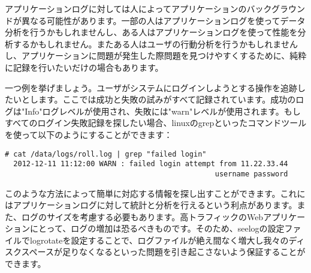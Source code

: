 アプリケーションログに対しては人によってアプリケーションのバックグラウンドが異なる可能性があります。一部の人はアプリケーションログを使ってデータ分析を行うかもしれませんし、ある人はアプリケーションログを使って性能を分析するかもしれません。またある人はユーザの行動分析を行うかもしれませんし、アプリケーションに問題が発生した際問題を見つけやすくするために、純粋に記録を行いたいだけの場合もあります。

一つ例を挙げましょう。ユーザがシステムにログインしようとする操作を追跡したいとします。ここでは成功と失敗の試みがすべて記録されています。成功のログは"Info"ログレベルが使用され、失敗には"warn"レベルが使用されます。もしすべてのログイン失敗記録を探したい場合、linuxのgrepといったコマンドツールを使って以下のようにすることができます：

\begin{lstlisting}[numbers=none]
# cat /data/logs/roll.log | grep "failed login"
  2012-12-11 11:12:00 WARN : failed login attempt from 11.22.33.44
                                                 username password
\end{lstlisting}


このような方法によって簡単に対応する情報を探し出すことができます。これにはアプリケーションログに対して統計と分析を行えるという利点があります。また、ログのサイズを考慮する必要もあります。高トラフィックのWebアプリケーションにとって、ログの増加は恐るべきものです。そのため、seelogの設定ファイルでlogrotateを設定することで、ログファイルが絶え間なく増大し我々のディスクスペースが足りなくなるといった問題を引き起こさないよう保証することができます。
